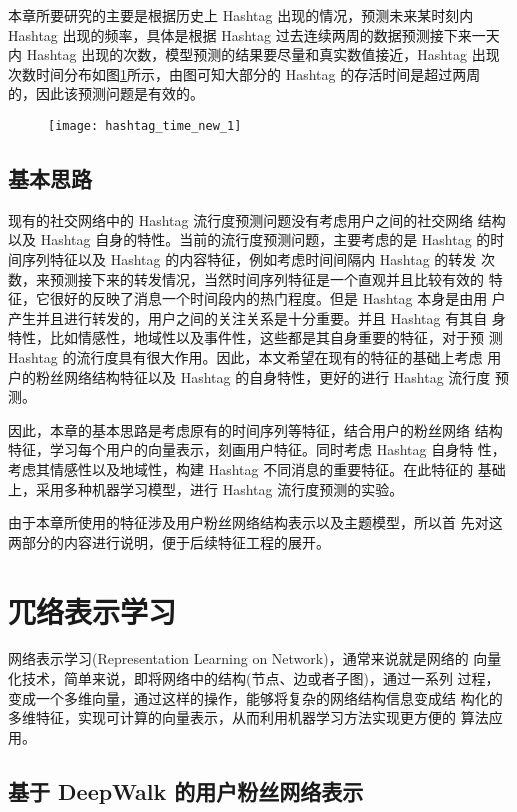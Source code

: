 本章所要研究的主要是根据历史上 Hashtag 出现的情况，预测未来某时刻内 Hashtag 出现的频率，具体是根据 Hashtag 过去连续两周的数据预测接下来一天 内 Hashtag 出现的次数，模型预测的结果要尽量和真实数值接近，Hashtag 出现 次数时间分布如图\ref{fig:3_1}所示，由图可知大部分的 Hashtag 的存活时间是超过两周 的，因此该预测问题是有效的。

\begin{figure}[H]
    \centering
    \texttt{[image: hashtag\_time\_new\_1]}
    \label{fig:3_1}
\end{figure}

\subsection{基本思路}
现有的社交网络中的 Hashtag 流行度预测问题没有考虑用户之间的社交网络 结构以及 Hashtag 自身的特性。当前的流行度预测问题，主要考虑的是 Hashtag 的时间序列特征以及 Hashtag 的内容特征，例如考虑时间间隔内 Hashtag 的转发 次数，来预测接下来的转发情况，当然时间序列特征是一个直观并且比较有效的 特征，它很好的反映了消息一个时间段内的热门程度。但是 Hashtag 本身是由用 户产生并且进行转发的，用户之间的关注关系是十分重要。并且 Hashtag 有其自 身特性，比如情感性，地域性以及事件性，这些都是其自身重要的特征，对于预 测 Hashtag 的流行度具有很大作用。因此，本文希望在现有的特征的基础上考虑 用户的粉丝网络结构特征以及 Hashtag 的自身特性，更好的进行 Hashtag 流行度 预测。

因此，本章的基本思路是考虑原有的时间序列等特征，结合用户的粉丝网络 结构特征，学习每个用户的向量表示，刻画用户特征。同时考虑 Hashtag 自身特 性，考虑其情感性以及地域性，构建 Hashtag 不同消息的重要特征。在此特征的 基础上，采用多种机器学习模型，进行 Hashtag 流行度预测的实验。

由于本章所使用的特征涉及用户粉丝网络结构表示以及主题模型，所以首 先对这两部分的内容进行说明，便于后续特征工程的展开。

\section{⺴络表示学习}
网络表示学习(Representation Learning on Network)，通常来说就是网络的
向量化技术，简单来说，即将网络中的结构(节点、边或者子图)，通过一系列
 过程，变成一个多维向量，通过这样的操作，能够将复杂的网络结构信息变成结 构化的多维特征，实现可计算的向量表示，从而利用机器学习方法实现更方便的 算法应用。

\subsection{基于 DeepWalk 的用户粉丝网络表示}

